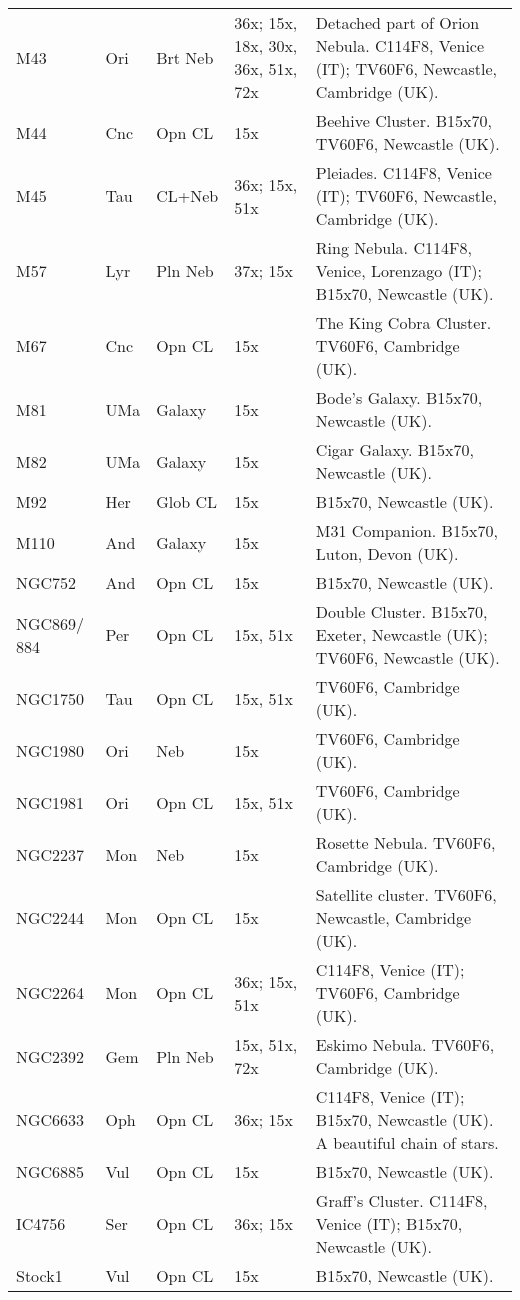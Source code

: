 \begin{longtable}{ p{0.7in}  p{0.3in}  p{0.6in}  p{0.9in}  p{5.8in} }
M43 & Ori & Brt Neb & 36x; 15x, 18x, 30x, 36x, 51x, 72x & Detached part of Orion Nebula. C114F8, Venice (IT); TV60F6, Newcastle, Cambridge (UK). \\ 
M44 & Cnc & Opn CL & 15x & Beehive Cluster. B15x70, TV60F6, Newcastle (UK). \\ 
M45 & Tau & CL+Neb & 36x; 15x, 51x & Pleiades. C114F8, Venice (IT); TV60F6, Newcastle, Cambridge (UK). \\ 
M57 & Lyr & Pln Neb & 37x; 15x & Ring Nebula. C114F8, Venice, Lorenzago (IT); B15x70, Newcastle (UK). \\ 
M67 & Cnc & Opn CL & 15x & The King Cobra Cluster. TV60F6, Cambridge (UK). \\ 
M81 & UMa & Galaxy & 15x & Bode's Galaxy. B15x70, Newcastle (UK). \\ 
M82 & UMa & Galaxy & 15x & Cigar Galaxy. B15x70, Newcastle (UK). \\ 
M92 & Her & Glob CL & 15x & B15x70, Newcastle (UK). \\ 
M110 & And & Galaxy & 15x & M31 Companion. B15x70, Luton, Devon (UK). \\ 
NGC752 & And & Opn CL & 15x & B15x70, Newcastle (UK). \\ 
NGC869/ 884 & Per & Opn CL & 15x, 51x & Double Cluster. B15x70, Exeter, Newcastle (UK); TV60F6, Newcastle (UK). \\ 
NGC1750 & Tau & Opn CL & 15x, 51x & TV60F6, Cambridge (UK). \\ 
NGC1980 & Ori & Neb & 15x & TV60F6, Cambridge (UK). \\ 
NGC1981 & Ori & Opn CL & 15x, 51x & TV60F6, Cambridge (UK). \\ 
NGC2237 & Mon & Neb & 15x & Rosette Nebula. TV60F6, Cambridge (UK). \\ 
NGC2244 & Mon & Opn CL & 15x & Satellite cluster. TV60F6, Newcastle, Cambridge (UK). \\ 
NGC2264 & Mon & Opn CL & 36x; 15x, 51x & C114F8, Venice (IT); TV60F6, Cambridge (UK). \\ 
NGC2392 & Gem & Pln Neb & 15x, 51x, 72x & Eskimo Nebula. TV60F6, Cambridge (UK). \\ 
NGC6633 & Oph & Opn CL & 36x; 15x & C114F8, Venice (IT); B15x70, Newcastle (UK). A beautiful chain of stars. \\ 
NGC6885 & Vul & Opn CL & 15x & B15x70, Newcastle (UK). \\ 
IC4756 & Ser & Opn CL & 36x; 15x & Graff's Cluster. C114F8, Venice (IT); B15x70, Newcastle (UK). \\ 
Stock1 & Vul & Opn CL & 15x & B15x70, Newcastle (UK). \\ 

\end{longtable}
